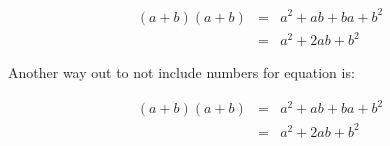 \documentclass{article}
\begin{document}
\begin{eqnarray}
(a+b)(a+b) & = & a^2+ab+ba+b^2 \nonumber\\
           & = & a^2+2ab+b^2
\end{eqnarray}

Another way out to not include numbers for equation is:

\begin{eqnarray*}
(a+b)(a+b) & = & a^2+ab+ba+b^2 \\
           & = & a^2+2ab+b^2
\end{eqnarray*}
\end{document}
